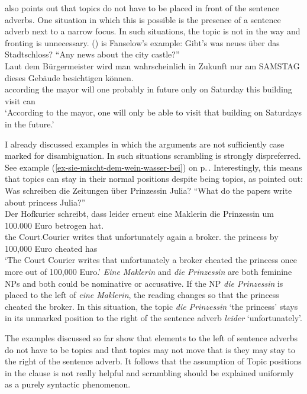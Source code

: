 \citet{Fanselow2006a} also points out that topics do not have to be placed in front of the sentence
adverbs. One situation in which this is possible is the presence of a sentence adverb next to a
narrow focus. In such situations, the topic is not in the way and fronting is unnecessary. ()
is Fanselow's example:
\ea
Gibt's was neues über das Stadtschloss? ``Any news about the city castle?''\\
\gll Laut dem Bürgermeister wird man wahrscheinlich in Zukunft nur am SAMSTAG dieses Gebäude besichtigen können.\\ 
     according the mayor will one probably in future only on Saturday this building visit can\\
\glt `According to the mayor, one will only be able to visit that building on Saturdays in the future.'
\z

\noindent
I already discussed examples in which the arguments are not sufficiently case marked for
disambiguation. In such situations scrambling is strongly dispreferred. See example (\ref{ex-sie-mischt-dem-wein-wasser-bei}) on p.\,\pageref{ex-sie-mischt-dem-wein-wasser-bei}. Interestingly, this means
that topics can stay in their normal positions despite being topics, as \citet[148]{Fanselow2006a}
pointed out:
\largerpage[2]
\ea
Was schreiben die Zeitungen über Prinzessin Julia? ``What do the papers write about princess Julia?''\\
\gll Der Hofkurier     schreibt, dass leider        erneut eine Maklerin    die Prinzessin um 100.000 Euro betrogen hat.\\
     the Court.Courier writes    that unfortunately again  a    broker.\F{} the princess   by 100,000 Euro cheated has\\
\glt `The Court Courier writes that unfortunately a broker cheated the princess once more out of 100,000 Euro.'
\z
\emph{Eine Maklerin} and \emph{die Prinzessin} are both feminine NPs and both could be nominative or
accusative. If the NP \emph{die Prinzessin} is placed to the left of \emph{eine Maklerin}, the reading changes so that the princess cheated the
broker. In this situation, the topic \emph{die Prinzessin} `the princess' stays in its unmarked position to the right of the
sentence adverb \emph{leider} `unfortunately'. 

The examples discussed so far show that elements to the left of
sentence adverbs do not have to be topics and that topics may not move that is they may stay to the
right of the sentence adverb. It follows that the assumption of Topic positions in the clause is not
really helpful and scrambling should be explained uniformly as a purely syntactic phenomenon.

